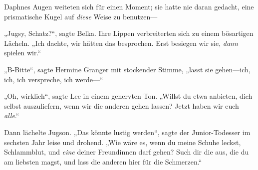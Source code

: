 Daphnes Augen weiteten sich für einen Moment; sie hatte nie daran gedacht, eine prismatische Kugel auf \emph{diese} Weise zu benutzen—

„Jugsy, Schatz?“, sagte Belka. Ihre Lippen verbreiterten sich zu einem bösartigen Lächeln. „Ich dachte, wir hätten das besprochen. Erst besiegen wir sie, \emph{dann} spielen wir.“

„B-Bitte“, sagte Hermine Granger mit stockender Stimme, „lasst sie gehen—ich, ich, ich verspreche, ich werde—“

„Oh, wirklich“, sagte Lee in einem genervten Ton. „Willst du etwa anbieten, dich selbst auszuliefern, wenn wir die anderen gehen lassen? Jetzt haben wir euch \emph{alle}.“

Dann lächelte Jugson. „Das könnte lustig werden“, sagte der Junior-Todesser im sechsten Jahr leise und drohend. „Wie wäre es, wenn du meine Schuhe leckst, Schlammblut, und \emph{eine} deiner Freundinnen darf gehen? Such dir die aus, die du am liebsten magst, und lass die anderen hier für die Schmerzen.“

